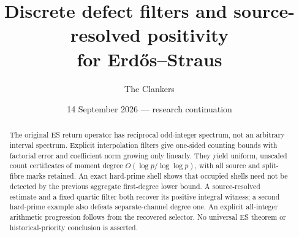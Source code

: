 \documentclass[10pt,a4paper]{article}
\title{Discrete defect filters and source-resolved positivity\\for Erd\H{o}s--Straus}
\author{The Clankers}
\date{14 September 2026 --- research continuation}
\begin{document}
\maketitle
\begin{abstract}
The original ES return operator has reciprocal odd-integer spectrum, not an
arbitrary interval spectrum. Explicit interpolation filters give one-sided
counting bounds with factorial error and coefficient norm growing only
linearly. They yield uniform, unscaled count certificates of moment degree
$O(\log p/\log\log p)$, with all source and split-fibre marks retained.
An exact hard-prime shell shows that occupied shells need not be detected by
the previous aggregate first-degree lower bound. A source-resolved estimate
and a fixed quartic filter both recover its positive integral witness; a second
hard-prime example also defeats separate-channel degree one. An explicit
all-integer arithmetic progression follows from the recovered selector.
No universal ES theorem or historical-priority conclusion is asserted.
\end{abstract}


\end{document}
